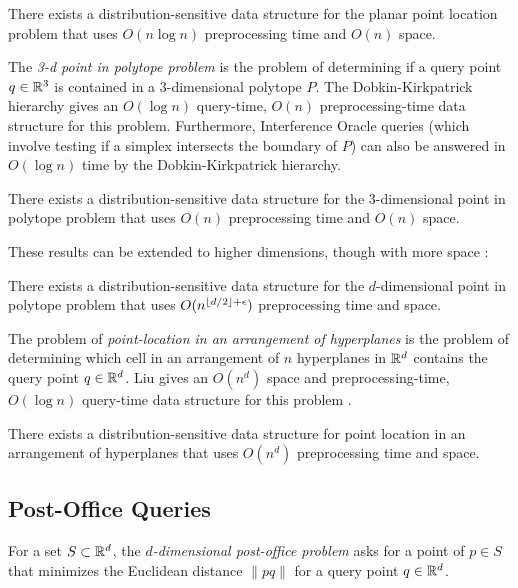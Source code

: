 \documentclass{patmorin}
\begin{document}
\begin{thm}
  There exists a distribution-sensitive data structure for the planar
  point location problem that uses $O(n\log n)$ preprocessing
  time and $O(n)$ space.
\end{thm}

The \emph{3-d point in polytope problem} is the problem of determining if
a query point $q\in\mathbb{R}^3$ is contained in a 3-dimensional polytope $P$.
The Dobkin-Kirkpatrick hierarchy \cite{dk83} gives an $O(\log n)$
query-time, $O(n)$ preprocessing-time data structure for this problem.
Furthermore, Interference Oracle queries (which involve testing if a
simplex intersects the boundary of $P$) can also be answered in $O(\log
n)$ time by the Dobkin-Kirkpatrick hierarchy.

\begin{thm}
  There exists a distribution-sensitive data structure for the
  3-dimensional point in polytope problem that uses $O(n)$ preprocessing
  time and $O(n)$ space.
\end{thm}

These results can be extended to higher dimensions, though with more
space \cite{c88}:

\begin{thm}
  There exists a distribution-sensitive data structure for
  the $d$-dimensional point in polytope problem that uses
  $O(n^{{\left\lfloor d/2 \right\rfloor}+\epsilon})$ preprocessing time and space.
\end{thm}

The problem of \emph{point-location in an arrangement of hyperplanes} is
the problem of determining which cell in an arrangement of $n$ hyperplanes
in $\mathbb{R}^d$ contains the query point $q\in\mathbb{R}^d$.  Liu gives an $O(n^d)$
space and preprocessing-time, $O(\log n)$ query-time data structure for
this problem \cite{l04}.

\begin{thm}
  There exists a distribution-sensitive data structure for point location
  in an arrangement of hyperplanes that uses $O(n^d)$ preprocessing time
  and space.
\end{thm}

\subsection{Post-Office Queries}

For a set $S\subset\mathbb{R}^d$, the \emph{$d$-dimensional post-office problem}
asks for a point of $p\in S$ that minimizes the Euclidean distance
$\|pq\|$ for a query point $q\in\mathbb{R}^d$.
\end{document}
